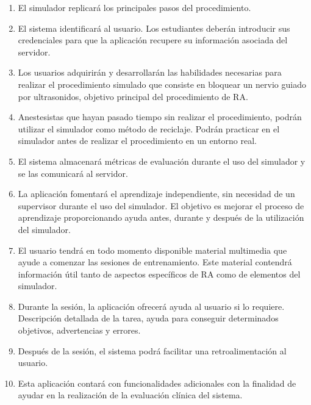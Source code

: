 \begin{enumerate}
    
\item El simulador replicará los principales pasos del procedimiento.
\item El sistema identificará al usuario. Los estudiantes deberán introducir sus credenciales para que la aplicación recupere su información asociada del servidor.
\item Los usuarios adquirirán y desarrollarán las habilidades necesarias para realizar el procedimiento simulado que consiste en bloquear un nervio guiado por ultrasonidos, objetivo principal del procedimiento de \ac{RA}.
\item Anestesistas que hayan pasado tiempo sin realizar el procedimiento, podrán utilizar el simulador como método de reciclaje. Podrán practicar en el simulador antes de realizar el procedimiento en un entorno real. 
\item  El sistema almacenará métricas de evaluación durante el uso del simulador y se las comunicará al servidor.
\item  La aplicación fomentará el aprendizaje independiente, sin necesidad de un supervisor durante el uso del simulador. El objetivo es mejorar el proceso de aprendizaje proporcionando ayuda antes, durante y después de la utilización del simulador. 

\item El usuario tendrá en todo momento disponible material multimedia que ayude a comenzar las sesiones de entrenamiento. Este material contendrá información útil tanto de aspectos específicos de \ac{RA} como de elementos del simulador.
\item Durante la sesión, la aplicación ofrecerá ayuda al usuario si lo requiere. Descripción detallada de la tarea, ayuda para conseguir determinados objetivos, advertencias y errores.
\item Después de la sesión, el sistema podrá facilitar una retroalimentación al usuario.
\item Esta aplicación contará con funcionalidades adicionales con la finalidad de ayudar en la realización de la evaluación clínica del sistema.
\end{enumerate}





